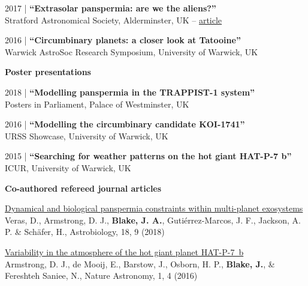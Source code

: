 \documentclass[10pt,a4paper]{altacv}
\begin{document}
\smallskip

\small 2017 | \textbf{``Extrasolar panspermia: are we the aliens?''} \\
Stratford Astronomical Society, Alderminster, UK -- \href{http://www.astro.org.uk/news/nov17/}{article}

\smallskip

\small 2016 | \textbf{``Circumbinary planets: a closer look at Tatooine''} \\
Warwick AstroSoc Research Symposium, University of Warwick, UK

\divider

\normalsize \textbf{Poster presentations}

\medskip

\small 2018 | \textbf{``Modelling panspermia in the TRAPPIST-1 system''} \\
Posters in Parliament, Palace of Westminster, UK

\smallskip

\small 2016 | \textbf{``Modelling the circumbinary candidate KOI-1741''} \\
URSS Showcase, University of Warwick, UK

\smallskip

\small 2015 | \textbf{``Searching for weather patterns on the hot giant HAT-P-7 b''} \\
ICUR, University of Warwick, UK

\medskip


\normalsize \textbf{Co-authored refereed journal articles} 

\medskip

\small
\href{https://www.liebertpub.com/doi/abs/10.1089/ast.2017.1786}{Dynamical and biological panspermia constraints within multi-planet exosystems} \\
Veras, D., Armstrong, D. J., \textbf{Blake, J. A.}, Guti{\'e}rrez-Marcos, J. F., Jackson, A. P. \& Sch{\"a}fer, H., Astrobiology, 18, 9 (2018)

\smallskip 

\small 
\href{https://www.nature.com/articles/s41550-016-0004}{Variability in the atmosphere of the hot giant planet HAT-P-7~b} \\
Armstrong, D. J., de Mooij, E., Barstow, J., Osborn, H. P., \textbf{Blake, J.}, \& Fereshteh Saniee, N., Nature Astronomy, 1, 4 (2016)

\clearpage

\end{document}

